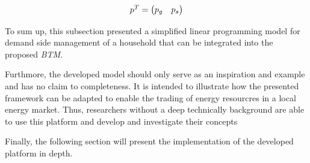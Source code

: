 \begin{equation*}
    \begin{array}{ll@{}ll}
		p^{T} = 
		\begin{pmatrix}
			p_{g} &
			p_{s}
		\end{pmatrix}
    \end{array}
\end{equation*}


To sum up, this subsection presented a simplified linear 
programming model for demand side management of a household
that can be integrated into the proposed \textit{BTM}.

Furthmore, the developed model should only serve as an inspiration and example
and has no claim to completeness. 
It is intended to illustrate how the presented framework can be adapted to enable the trading 
of energy resourcres in a local energy market. 
Thus, researchers without a deep technically background are able to use this platform and
develop and investigate their concepts 

Finally, the following section will present the implementation of the developed platform in depth.

\clearpage